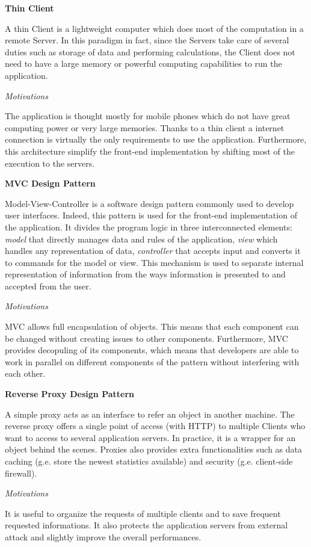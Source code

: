 \documentclass{report}
\begin{document}
\begin{center}\large{\textbf{Thin Client}}\end{center}
A thin Client is a lightweight computer which does most of the computation in a remote Server. In this paradigm in fact, since the Servers take care of several duties such as storage 
of data and performing calculations, the Client does not need to have a large memory or powerful computing capabilities to run the application.
\begin{center}\large{\textit{Motivations}}\end{center} 
The application is thought mostly for mobile phones which do not have great computing power or very large memories. Thanks to a thin client a internet connection is virtually the only requirements to use the application. Furthermore, this architecture simplify the front-end implementation by shifting most of the execution to the servers.

\begin{center}\large{\textbf{MVC Design Pattern}}\end{center}
Model-View-Controller is a software design pattern commonly used to develop user interfaces. Indeed, this pattern is used for the front-end implementation of the application. It divides the program logic in three interconnected elements: \textit{model} that directly manages data and rules of the application, \textit{view} which handles any representation of data, \textit{controller} that 
accepts input and converts it to commands for the model or view. This mechanism is used to separate internal representation of information from the ways information is presented to and accepted from the user. \\
\begin{center}\large{\textit{Motivations}}\end{center} 
MVC allows full encapsulation of objects. This means that each component can be changed without creating issues to other components.
Furthermore, MVC provides decopuling of its components, which means that developers are able to work in parallel on different components of the pattern without interfering with each other.

\begin{center}\large{\textbf{Reverse Proxy Design Pattern}}\end{center}
A simple proxy acts as an interface to refer an object in another machine. The reverse proxy offers a single point of access (with HTTP) to multiple Clients who want to access to several application servers. In practice, it is a wrapper for an object behind the scenes. 
Proxies also provides extra functionalities such as data caching (g.e. store the newest statistics available) and security (g.e. client-side firewall).\\
\begin{center}\large{\textit{Motivations}}\end{center} 
It is useful to organize the requests of multiple clients and to save frequent requested informations. It also protects the application servers from external attack and slightly improve the overall performances.
\end{document}
